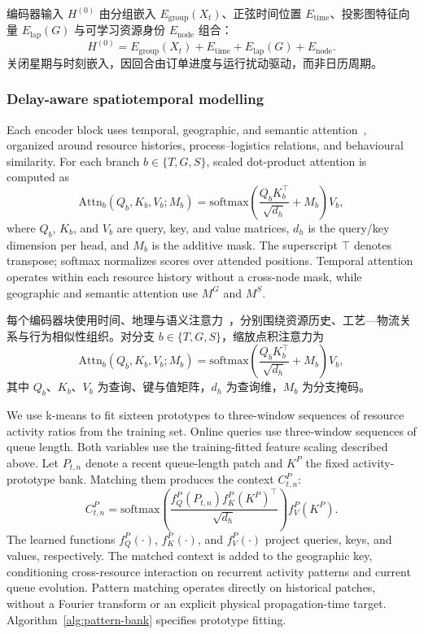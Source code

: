 \documentclass[a4paper,fleqn]{cas-dc}
\newcommand{\zhpara}[1]{%
  \par\begingroup\small\color{black!72}\noindent #1\par\endgroup}
\begin{document}
\zhpara{编码器输入 $H^{(0)}$ 由分组嵌入 $E_{\mathrm{group}}(X_t)$、正弦时间位置 $E_{\mathrm{time}}$、投影图特征向量 $E_{\mathrm{lap}}(G)$ 与可学习资源身份 $E_{\mathrm{node}}$ 组合：
\begin{equation}
H^{(0)}=E_{\mathrm{group}}(X_t)+
E_{\mathrm{time}}+E_{\mathrm{lap}}(G)+E_{\mathrm{node}}.
\end{equation}
关闭星期与时刻嵌入，因回合由订单进度与运行扰动驱动，而非日历周期。}


\subsubsection{Delay-aware spatiotemporal modelling}

Each encoder block uses temporal, geographic, and semantic attention~\cite{jiang2023pdformer}, organized around resource histories, process--logistics relations, and behavioural similarity. For each branch $b\in\{T,G,S\}$, scaled dot-product attention is computed as
\begin{equation}
\mathrm{Attn}_{b}(Q_b,K_b,V_b;M_b)
=\mathrm{softmax}\!\left(
\frac{Q_bK_b^\top}{\sqrt{d_h}}+M_b
\right)V_b ,
\end{equation}
where $Q_b$, $K_b$, and $V_b$ are query, key, and value matrices, $d_h$ is the query/key dimension per head, and $M_b$ is the additive mask. The superscript $\top$ denotes transpose; softmax normalizes scores over attended positions. Temporal attention operates within each resource history without a cross-node mask, while geographic and semantic attention use $M^G$ and $M^S$.

\zhpara{每个编码器块使用时间、地理与语义注意力~\cite{jiang2023pdformer}，分别围绕资源历史、工艺—物流关系与行为相似性组织。对分支 $b\in\{T,G,S\}$，缩放点积注意力为
\begin{equation}
\mathrm{Attn}_{b}(Q_b,K_b,V_b;M_b)
=\mathrm{softmax}\!\left(
\frac{Q_bK_b^\top}{\sqrt{d_h}}+M_b
\right)V_b ,
\end{equation}
其中 $Q_b$、$K_b$、$V_b$ 为查询、键与值矩阵，$d_h$ 为查询维，$M_b$ 为分支掩码。}


We use k-means to fit sixteen prototypes to three-window sequences of resource activity ratios from the training set. Online queries use three-window sequences of queue length. Both variables use the training-fitted feature scaling described above. Let $P_{t,n}$ denote a recent queue-length patch and $K^P$ the fixed activity-prototype bank. Matching them produces the context $C^P_{t,n}$:
\begin{equation}
C^P_{t,n}=
\mathrm{softmax}\!\left(
\frac{f_Q^P(P_{t,n})f_K^P(K^P)^\top}{\sqrt{d_h}}
\right)f_V^P(K^P).
\end{equation}
The learned functions $f_Q^P(\cdot)$, $f_K^P(\cdot)$, and $f_V^P(\cdot)$ project queries, keys, and values, respectively. The matched context is added to the geographic key, conditioning cross-resource interaction on recurrent activity patterns and current queue evolution. Pattern matching operates directly on historical patches, without a Fourier transform or an explicit physical propagation-time target. Algorithm~\ref{alg:pattern-bank} specifies prototype fitting.
\end{document}
